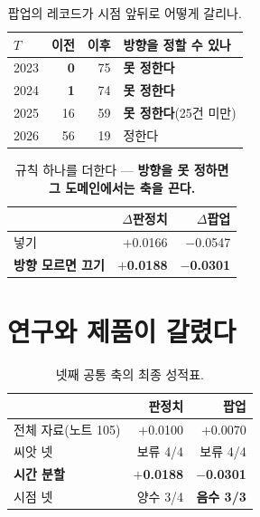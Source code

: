 \documentclass[10pt]{article}
\begin{document}
\begin{table}[t]
\centering\tsize
\caption{팝업의 레코드가 시점 앞뒤로 어떻게 갈리나.}
\begin{tabular}{lrrl}
\toprule
$T$ & 이전 & 이후 & 방향을 정할 수 있나 \\
\midrule
2023 & \textbf{0} & 75 & \textbf{못 정한다} \\
2024 & \textbf{1} & 74 & \textbf{못 정한다} \\
2025 & 16 & 59 & \textbf{못 정한다}(25건 미만) \\
2026 & 56 & 19 & 정한다 \\
\bottomrule
\end{tabular}
\end{table}


\begin{table}[t]
\centering\tsize
\caption{규칙 하나를 더한다 --- \textbf{방향을 못 정하면 그 도메인에서는
축을 끈다.}}
\begin{tabular}{lrr}
\toprule
& $\Delta$판정치 & $\Delta$팝업 \\
\midrule
넣기 & $+$0.0166 & $-$0.0547 \\
\textbf{방향 모르면 끄기} & \textbf{$+$0.0188} & \textbf{$-$0.0301} \\
\bottomrule
\end{tabular}
\end{table}


\section{연구와 제품이 갈렸다}

\begin{table}[t]
\centering\tsize
\caption{넷째 공통 축의 최종 성적표.}
\begin{tabular}{lrr}
\toprule
& 판정치 & 팝업 \\
\midrule
전체 자료(노트 105) & $+$0.0100 & $+$0.0070 \\
\quad 씨앗 넷 & 보류 4/4 & 보류 4/4 \\
\textbf{시간 분할} & \textbf{$+$0.0188} & \textbf{$-$0.0301} \\
\quad 시점 넷 & 양수 3/4 & \textbf{음수 3/3} \\
\bottomrule
\end{tabular}
\end{table}
\end{document}
